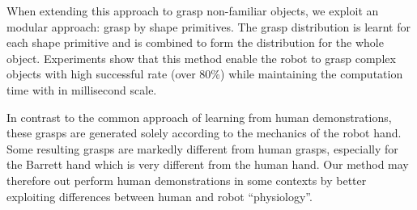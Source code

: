 When extending this approach to grasp non-familiar objects, we exploit an modular approach: grasp by shape primitives. The grasp distribution is learnt for each shape primitive and is combined to form the distribution for the whole object. Experiments show that this method enable the robot to grasp complex objects with high successful rate (over 80\%) while maintaining the computation time with in millisecond scale. 

In contrast to the common approach of learning from human demonstrations,
these grasps are generated solely according to the mechanics of the robot hand.
Some resulting grasps are markedly different from  human grasps, especially for the Barrett hand which is very different from the human hand.
Our method may therefore out perform human demonstrations in some
contexts by better exploiting differences between human and robot ``physiology''. 
